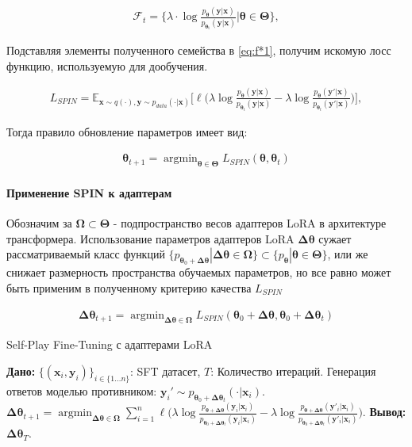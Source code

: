\documentclass[12pt, twoside]{article}
\newcommand{\bx}{\mathbf{x}}
\newcommand{\by}{\mathbf{y}}
\newcommand{\bOmega}{\boldsymbol{\Omega}}
\newcommand{\btheta}{\boldsymbol{\theta}}
\newcommand{\bTheta}{\boldsymbol{\Theta}}
\newcommand{\bDelta}{\boldsymbol{\Delta}}
\newcommand{\cF}{\mathcal{F}}
\newcommand{\EE}{\mathbb{E}}
\newcommand{\argmin}{\mathop{\mathrm{argmin}}}
\begin{document}
\begin{align}
\cF_{t} = \bigg\{\lambda\cdot \log \frac{p_{\btheta}(\by | \bx)}{p_{\mathrm{\btheta_t}}(\by | \bx)}\bigg|\btheta \in \bTheta\bigg\},   \label{eq:function class0} 
\end{align}

Подставляя элементы полученного семейства в \eqref{eq:f*1}, получим искомую лосс функцию, используемую для дообучения.

\begin{align}
L_{SPIN}= \EE_{\bx\sim q(\cdot), \by\sim p_{data}(\cdot | \bx)}\bigg[\ell\bigg(\lambda \log \frac{p_{\btheta}(\by | \bx)}{p_{\btheta_t}(\by | \bx)}-\lambda \log \frac{p_{\btheta}(\by' | \bx)}{p_{\btheta_t}(\by' | \bx)}\bigg)\bigg], \label{eq:loss}  
\end{align}

Тогда правило обновление параметров имеет вид:

\begin{align}
    \btheta_{t+1} = \argmin_{\btheta \in \bTheta} L_{SPIN} (\btheta, \btheta_t)
\end{align}


\paragraph{Применение SPIN к адаптерам}

Обозначим за $\bOmega \subset \bTheta$ - подпространство весов адаптеров LoRA в архитектуре трансформера. Использование параметров адаптеров LoRA $\bDelta\btheta$ сужает рассматриваемый класс функций $\{p_{\btheta_0 + \bDelta\btheta} | \bDelta\btheta \in \bOmega\} \subset \{p_{\btheta} | \btheta \in \bTheta\}$, или же снижает размерность пространства обучаемых параметров, но все равно может быть применим в полученному критерию качества $L_{SPIN}$

\begin{align}
    \bDelta\btheta_{t+1} = \argmin_{\bDelta\btheta \in \bOmega} L_{SPIN} (\btheta_0 + \bDelta\btheta, \btheta_0 + \bDelta \btheta_t)
\end{align}

\begin{algorithm}[ht!]
\caption{Self-Play Fine-Tuning с адаптерами LoRA}\label{alg:Improving}
\begin{algorithmic}%
\STATE \textbf{Дано:} $\{(\bx_i, \by_i)\}_{i\in \{1 ... n\}}$: SFT датасет, $T$: Количество итераций. 
\STATE Генерация ответов моделью противником: $\by_{i}' \sim p_{\btheta_0 + \bDelta \btheta_t}(\cdot|\bx_i)$.
\ENDFOR 
\STATE  $\bDelta\btheta_{t+1} = \argmin_{\bDelta\btheta \in \bOmega} \sum_{i = 1}^n\ell\Big(\lambda \log \frac{p_{\btheta + \bDelta \btheta}(\by_i | \bx_i)}{p_{\btheta_0 + \bDelta \btheta_t}(\by_i | \bx_i)}-\lambda \log \frac{p_{\btheta + \bDelta \btheta}(\by'_i | \bx_i)}{p_{\btheta_0 + \bDelta \btheta_t}(\by'_i | \bx_i)}\Big)$.
\ENDFOR
\STATE \textbf{Вывод:} $\bDelta \btheta_T$.
\end{algorithmic}
\end{algorithm}
\end{document}

